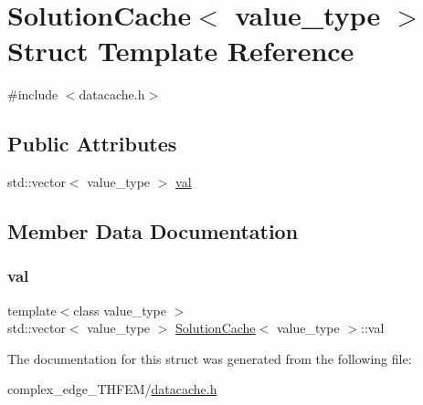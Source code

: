 \hypertarget{struct_solution_cache}{}\section{Solution\+Cache$<$ value\+\_\+type $>$ Struct Template Reference}
\label{struct_solution_cache}


{\ttfamily \#include $<$datacache.\+h$>$}

\subsection*{Public Attributes}
\begin{DoxyCompactItemize}
\item 
std\+::vector$<$ value\+\_\+type $>$ \mbox{\hyperlink{struct_solution_cache_aa45492c5fb1bcd26f67f5e4729f9b064}{val}}
\end{DoxyCompactItemize}


\subsection{Member Data Documentation}
\mbox{\label{struct_solution_cache_aa45492c5fb1bcd26f67f5e4729f9b064}} 
\subsubsection{\texorpdfstring{val}{val}}
{\footnotesize\ttfamily template$<$class value\+\_\+type $>$ \\
std\+::vector$<$ value\+\_\+type $>$ \mbox{\hyperlink{struct_solution_cache}{Solution\+Cache}}$<$ value\+\_\+type $>$\+::val}



The documentation for this struct was generated from the following file\+:\begin{DoxyCompactItemize}
\item 
complex\+\_\+edge\+\_\+\+T\+H\+F\+E\+M/\mbox{\hyperlink{complex__edge___t_h_f_e_m_2datacache_8h}{datacache.\+h}}\end{DoxyCompactItemize}
